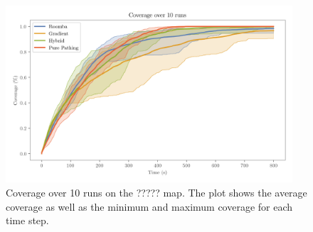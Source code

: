 \begin{figure}[H]
    \begin{center}
        \includegraphics[width=0.95\textwidth]{./figures/plots/benchmarks/coverage-over-10-runs.png}
    \end{center}
    \caption{Coverage over 10 runs on the {\color{red}?????} map. The plot shows the average coverage as well as the minimum and maximum coverage for each time step.}
    \label{fig:coverage-benchmark}
\end{figure}
